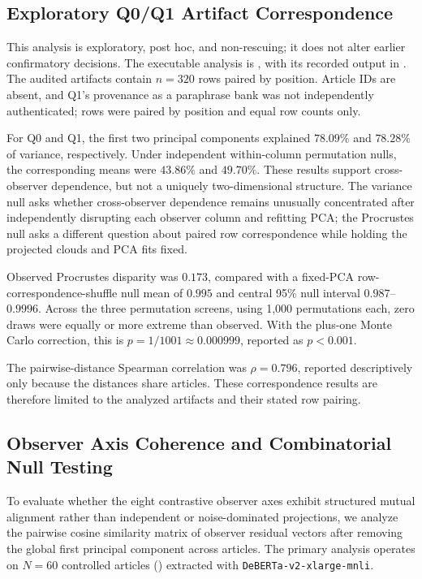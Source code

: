 \subsection{Exploratory Q0/Q1 Artifact Correspondence}

This analysis is exploratory, post hoc, and non-rescuing; it does not alter earlier confirmatory
decisions. The executable analysis is , with its recorded output in
. The audited artifacts contain $n=320$
rows paired by position. Article IDs are absent, and Q1's provenance as a paraphrase bank was not
independently authenticated; rows were paired by position and equal row counts only.

For Q0 and Q1, the first two principal components explained $78.09\%$ and $78.28\%$ of variance,
respectively. Under independent within-column permutation nulls, the corresponding means were
$43.86\%$ and $49.70\%$. These results support cross-observer dependence, but not a uniquely
two-dimensional structure. The variance null asks whether cross-observer dependence remains
unusually concentrated after independently disrupting each observer column and refitting PCA;
the Procrustes null asks a different question about paired row correspondence while holding the
projected clouds and PCA fits fixed.

Observed Procrustes disparity was $0.173$, compared with a fixed-PCA row-correspondence-shuffle
null mean of $0.995$ and central 95\% null interval $0.987$--$0.9996$. Across the three permutation
screens, using 1,000 permutations each, zero draws were equally or more extreme than observed.
With the plus-one Monte Carlo correction, this is $p=1/1001\approx0.000999$, reported as
$p<0.001$.

The pairwise-distance Spearman correlation was $\rho=0.796$, reported descriptively only because
the distances share articles. These correspondence results are therefore limited to the
analyzed artifacts and their stated row pairing.

\subsection{Observer Axis Coherence and Combinatorial Null Testing}
\label{sec:axis_coherence_results}

To evaluate whether the eight contrastive observer axes exhibit structured mutual alignment rather than independent or noise-dominated projections, we analyze the pairwise cosine similarity matrix of observer residual vectors after removing the global first principal component across articles. The primary analysis operates on $N=60$ controlled articles () extracted with \texttt{DeBERTa-v2-xlarge-mnli}.

